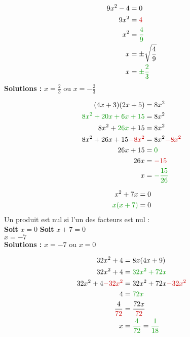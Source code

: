 \begin{pagesolutions}
    \begin{tcolorbox}[cartesolution={13}]
        \begin{align*}
            9x^2 - 4 &= 0 \\
            9x^2 &= \modif{4} \\
            x^2 &= \reduc{\frac{4}{9}} \\
            x &= \pm\sqrt{\frac{4}{9}} \\
            x &= \reduc{\pm\frac{2}{3}}
        \end{align*}
        \vspace{0.3cm}
        \textbf{Solutions :} $x = \frac{2}{3}$ ou $x = -\frac{2}{3}$
    \end{tcolorbox}
    \begin{tcolorbox}[cartesolution={14}]
        \begin{align*}
            (4x + 3)(2x + 5) &= 8x^2 \\
            \reduc{8x^2 + 20x + 6x + 15} &= 8x^2 \\
            8x^2 + \reduc{26x} + 15 &= 8x^2 \\
            8x^2 + 26x + 15 \modif{- 8x^2} &= 8x^2 \modif{- 8x^2} \\
            26x + 15 &= \reduc{0} \\
            26x &= \modif{-15} \\
            x &= \reduc{-\frac{15}{26}}
        \end{align*}
    \end{tcolorbox}
    \begin{tcolorbox}[cartesolution={15}]
        \begin{align*}
            x^2 + 7x &= 0 \\
            \reduc{x(x + 7)} &= 0
        \end{align*}
        \vspace{0.3cm}
        Un produit est nul si l'un des facteurs est nul :\\[0.2cm]
        \textbf{Soit} $x = 0$ \quad \textbf{Soit} $x + 7 = 0$\\
        \phantom{Soit $x = 0$} \quad\quad\quad $x = -7$\\[0.3cm]
        \textbf{Solutions :} $x = -7$ ou $x = 0$
    \end{tcolorbox}
    \begin{tcolorbox}[cartesolution={16}]
        \begin{align*}
            32x^2 + 4 &= 8x(4x + 9) \\
            32x^2 + 4 &= \reduc{32x^2 + 72x} \\
            32x^2 + 4 \modif{- 32x^2} &= 32x^2 + 72x \modif{- 32x^2} \\
            4 &= \reduc{72x} \\
            \frac{4}{\modif{72}} &= \frac{72x}{\modif{72}} \\
            x &= \reduc{\frac{4}{72}} = \reduc{\frac{1}{18}}
        \end{align*}
    \end{tcolorbox}
\end{pagesolutions}
